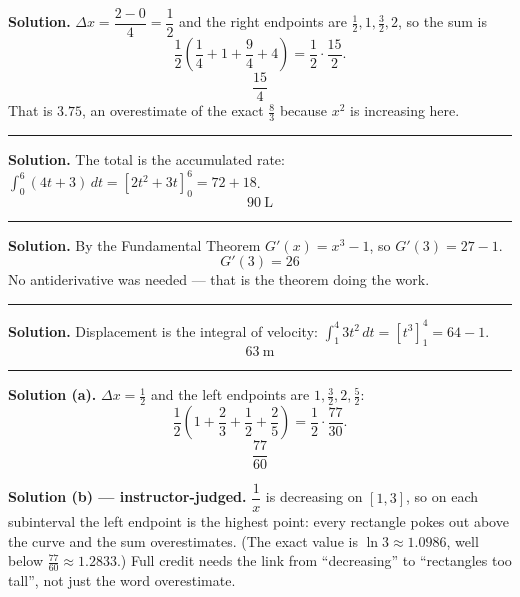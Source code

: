 \documentclass[12pt]{article}
\begin{document}



\textbf{Solution.} $\Delta x = \dfrac{2 - 0}{4} = \dfrac{1}{2}$ and the right
endpoints are $\tfrac{1}{2}, 1, \tfrac{3}{2}, 2$, so the sum is
\[ \frac{1}{2}\left(\frac{1}{4} + 1 + \frac{9}{4} + 4\right)
   = \frac{1}{2}\cdot\frac{15}{2}. \]
\[ \boxed{\frac{15}{4}} \]
That is $3.75$, an overestimate of the exact $\tfrac{8}{3}$ because $x^2$ is
increasing here.

\vspace{0.15cm}\noindent\rule{\linewidth}{0.2pt}


\textbf{Solution.} The total is the accumulated rate:
$\int_0^6 (4t + 3)\,dt = \left[2t^2 + 3t\right]_0^6 = 72 + 18$.
\[ \boxed{90\ \text{L}} \]

\vspace{0.15cm}\noindent\rule{\linewidth}{0.2pt}


\textbf{Solution.} By the Fundamental Theorem $G'(x) = x^3 - 1$, so
$G'(3) = 27 - 1$.
\[ \boxed{G'(3) = 26} \]
No antiderivative was needed --- that is the theorem doing the work.

\vspace{0.15cm}\noindent\rule{\linewidth}{0.2pt}


\textbf{Solution.} Displacement is the integral of velocity:
$\int_1^4 3t^2\,dt = \left[t^3\right]_1^4 = 64 - 1$.
\[ \boxed{63\ \text{m}} \]

\vspace{0.15cm}\noindent\rule{\linewidth}{0.2pt}


\textbf{Solution (a).} $\Delta x = \tfrac{1}{2}$ and the left endpoints are
$1, \tfrac{3}{2}, 2, \tfrac{5}{2}$:
\[ \frac{1}{2}\left(1 + \frac{2}{3} + \frac{1}{2} + \frac{2}{5}\right)
   = \frac{1}{2}\cdot\frac{77}{30}. \]
\[ \boxed{\frac{77}{60}} \]

\textbf{Solution (b) --- instructor-judged.} $\dfrac{1}{x}$ is decreasing on
$[1,3]$, so on each subinterval the left endpoint is the highest point: every
rectangle pokes out above the curve and the sum overestimates. (The exact value
is $\ln 3 \approx 1.0986$, well below $\tfrac{77}{60} \approx 1.2833$.) Full
credit needs the link from ``decreasing'' to ``rectangles too tall'', not just
the word overestimate.
\end{document}

